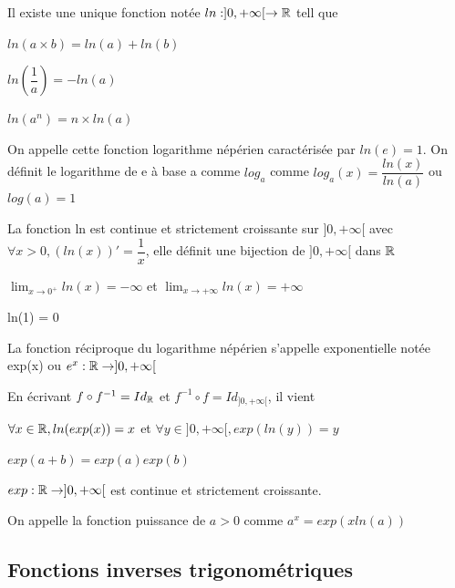 \documentclass[a4paper, 12pt]{article}
\begin{document}
\begin{definition}
    Il existe une unique fonction notée $ln : ]0, +\infty[ \rightarrow \mathbb{R}$ tell que
    \item $ln(a \times b) = ln(a) + ln(b)$
    \item $ln(\dfrac{1}{a}) = -ln(a)$
    \item $ln(a^n) = n\times ln(a)$
    
    \item On appelle cette fonction logarithme népérien caractérisée par $ln(e) = 1$.
    On définit le logarithme de e à base a comme $log_a$ comme $log_a(x) = \dfrac{ln(x)}{ln(a)}$ ou $log(a) = 1$
\end{definition}

\begin{proprietes}
    La fonction ln est continue et strictement croissante sur $]0, +\infty[$ avec
    $\forall x \gt 0, (ln (x))' = \dfrac{1}{x}$, elle définit une bijection de $]0, +\infty[$ dans $\mathbb{R}$

    \item $\lim_{x \to 0^+} ln(x) = - \infty$ et $\lim_{x \to +\infty} ln(x) = +\infty$
    \item ln(1) = 0
\end{proprietes}

\begin{definition}
    La fonction réciproque du logarithme népérien s'appelle exponentielle notée exp(x) ou $e^x: \mathbb{R} \rightarrow ]0, +\infty[$
\end{definition}

\begin{proprietes}
    En écrivant $f \circ f^{-1} = Id_{\mathbb{R}}$ et $f^{-1} \circ f = Id_{]0, +\infty[}$, il vient
    \item $\forall x \in \mathbb{R}, ln(exp(x)) = x$ et $\forall y \in ]0, +\infty[, exp(ln(y))=y$
    \item $exp(a + b) = exp(a) exp(b)$
    \item $exp: \mathbb{R} \rightarrow ]0, +\infty[$ est continue et strictement croissante.
\end{proprietes}

\begin{definition}
    On appelle la fonction puissance de $a \gt 0$ comme $a^x = exp(x ln(a))$
\end{definition}




\subsection{Fonctions inverses trigonométriques}
\end{document}
